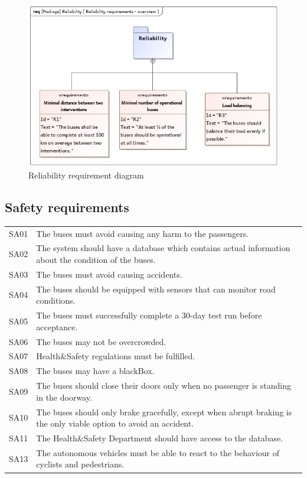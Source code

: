 \documentclass[a4paper]{article}
\begin{document}
\begin{figure}
	\centering
	\includegraphics[width=.75\textwidth]{req-reliability.jpg}
	\caption{Reliability requirement diagram}%
	\label{fig:req-reliability}
\end{figure}

\subsection{Safety requirements}
\begin{tabularx}{\textwidth}{p{.9cm} X}
        SA01 & The buses must avoid causing any harm to the passengers. \\

	SA02 & The system should have a database which contains actual
	       information about the condition of the buses. \\

        SA03 & The buses must avoid causing accidents. \\

	SA04 & The buses should be equipped with \gls{sensor}s that can
	       \gls{monitor} road conditions. \\

	SA05 & The buses must successfully complete a 30-day test run before
	       acceptance. \\

        SA06 & The buses may not be overcrowded. \\

        SA07 & Health\&Safety regulations must be fulfilled. \\

        SA08 & The buses may have a \gls{blackBox}. \\

	SA09 & The buses should close their doors only when no passenger is
	       standing in the doorway. \\

	SA10 & The buses should only brake gracefully, except when abrupt
	       braking is the only viable option to avoid an accident. \\

	SA11 & The Health\&Safety Department should have access to the database.
	       \\

	SA13 & The \gls{autonomous} \gls{vehicle}s must be able to react to the
	       behaviour of cyclists and pedestrians. \\
\end{tabularx}
\end{document}
